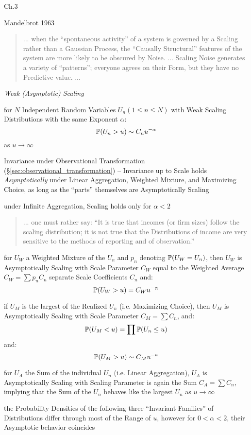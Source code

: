 Ch.3

Mandelbrot 1963

\begin{quote}
  ... when the ``spontaneous activity'' of a system is governed by a Scaling
  rather than a Gaussian Process, the ``Causally Structural'' features of the
  system are more likely to be obscured by Noise. ... Scaling Noise generates a
  variety of ``patterns''; everyone agrees on their Form, but they have no
  Predictive value. ...
\end{quote}

\emph{Weak (Asymptotic) Scaling}

for $N$ Independent Random Variables $U_n(1 \leq n \leq N)$ with Weak Scaling
Distributions with the same Exponent $\alpha$:
\[
  \mathbb{P}(U_n > u) \sim C_n u^{-\alpha}
\]
as $u \to \infty$

Invariance under Observational Transformation
(\S\ref{sec:observational_transformation}) -- Invariance up to Scale holds
\emph{Asymptotically} under Linear Aggregation, Weighted Mixture, and Maximizing
Choice, as long as the ``parts'' themselves are Asymptotically Scaling

under Infinite Aggregation, Scaling holds only for $\alpha < 2$

\begin{quote}
  ... one must rather say: ``It is true that incomes (or firm sizes) follow the
  scaling distribution; it is not true that the Distributions of income are very
  sensitive to the methods of reporting and of observation.''
\end{quote}

for $U_W$ a Weighted Mixture of the $U_n$ and $p_n$ denoting $\mathbb{P}(U_W = U_n)$,
then $U_W$ is Asymptotically Scaling with Scale Parameter $C_W$ equal to the
Weighted Average $C_W = \sum p_n C_n$ separate Scale Coefficients $C_n$ and:
\[
  \mathbb{P}(U_W > u) = C_W u^{-\alpha}
\]

if $U_M$ is the largest of the Realized $U_n$ (i.e. Maximizing Choice), then
$U_M$ is Asymptotically Scaling with Scale Parameter $C_M = \sum C_n$, and:
\[
  \mathbb{P}(U_M < u) = \prod \mathbb{P}(U_n \leq u)
\]
and:
\[
  \mathbb{P}(U_M > u) \sim C_M u^{-a}
\]

for $U_A$ the Sum of the individual $U_n$ (i.e. Linear Aggregation), $U_A$ is
Asymptotically Scaling with Scaling Parameter is again the Sum $C_A = \sum C_n$,
implying that the Sum of the $U_n$ behaves like the largest $U_n$ as
$u \to \infty$

the Probability Densities of the following three ``Invariant Families'' of
Distributions differ through most of the Range of $u$, however for $0 < \alpha <
2$, their Asymptotic behavior coincides

